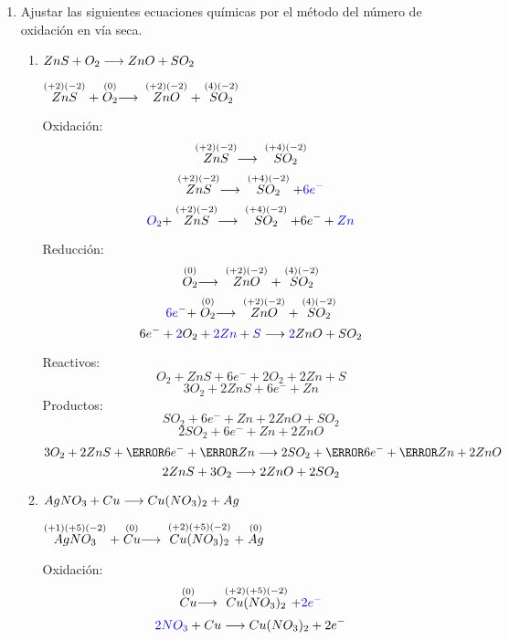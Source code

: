 \documentclass[../Práctica.root.tex]{subfiles}
\begin{document}
\begin{enumerate}
\begin{enumerate}
          \end{enumerate}

    \item Ajustar las siguientes ecuaciones químicas por el método del número de oxidación en vía
          seca.
          \begin{enumerate}
              \item $ZnS + O_2 \longrightarrow{} ZnO + SO_2$

                    $\stackrel{(+2)(-2)}{ZnS} + \stackrel{(0)}{O_2} \longrightarrow{} \stackrel{(+2)(-2)}{ZnO} + \stackrel{(4)(-2)}{SO_2}$

                    \begin{multicols}{2}
                        Oxidación:
                        \[ \stackrel{(+2)(-2)}{ZnS} \longrightarrow{} \stackrel{(+4)(-2)}{SO_2} \]
                        \[ \stackrel{(+2)(-2)}{ZnS} \longrightarrow{} \stackrel{(+4)(-2)}{SO_2} + \textcolor{blue}{6e^-} \]
                        \[ \textcolor{blue}{O_2} + \stackrel{(+2)(-2)}{ZnS} \longrightarrow{} \stackrel{(+4)(-2)}{SO_2} + 6 e^- + \textcolor{blue}{Zn} \]

                        \columnbreak

                        Reducción:
                        \[ \stackrel{(0)}{O_2} \longrightarrow{} \stackrel{(+2)(-2)}{ZnO} + \stackrel{(4)(-2)}{SO_2} \]
                        \[ \textcolor{blue}{6e^-} + \stackrel{(0)}{O_2} \longrightarrow{} \stackrel{(+2)(-2)}{ZnO} + \stackrel{(4)(-2)}{SO_2} \]
                        \[ 6 e^- + \textcolor{blue}{2} O_2 + \textcolor{blue}{2Zn} + \textcolor{blue}{S} \longrightarrow{} \textcolor{blue}{2} ZnO + SO_2 \]
                    \end{multicols}


                    Reactivos:
                    \[ O_2 + ZnS + 6 e^- + 2 O_2 + 2Zn + S \]
                    \[ 3 O_2 + 2 ZnS + 6 e^- + Zn \]
                    Productos:
                    \[ SO_2 + 6 e^- + Zn + 2 ZnO + SO_2 \]
                    \[ 2 SO_2 + 6 e^- + Zn + 2 ZnO \]
                    \[ 3 O_2 + 2 ZnS + \cancel{6 e^-} + \cancel{Zn} \lra 2 SO_2 + \cancel{6 e^-} + \cancel{Zn} + 2 ZnO \]
                    \[ 2 ZnS + 3 O_2 \longrightarrow{} 2 ZnO + 2 SO_2 \]

              \item $AgNO_3 + Cu \longrightarrow{} Cu(NO_3)_2 + Ag$

                    $\stackrel{(+1)(+5)(-2)}{AgNO_3} + \stackrel{(0)}{Cu} \longrightarrow{} \stackrel{(+2)(+5)(-2)}{Cu(NO_3)_2} + \stackrel{(0)}{Ag}$

                    \begin{multicols}{2}
                        Oxidación:
                        \[ \stackrel{(0)}{Cu} \longrightarrow{} \stackrel{(+2)(+5)(-2)}{Cu(NO_3)_2} + \textcolor{blue}{2e^-} \]
                        \[ \textcolor{blue}{2NO_3} + Cu \longrightarrow{} Cu(NO_3)_2 + 2 e^- \]


\end{multicols}
\end{enumerate}
\end{enumerate}
\end{document}
